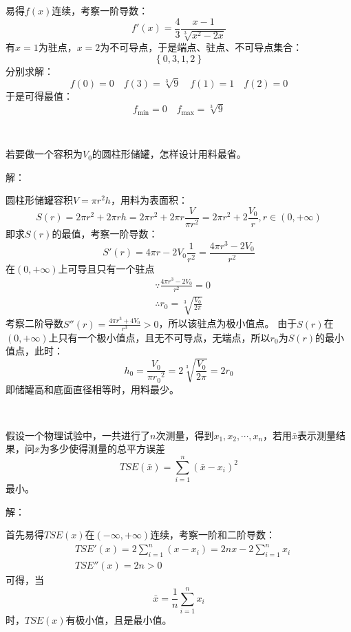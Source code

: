 易得$f\left( x \right) $连续，考察一阶导数：
\[
f'\left( x \right) =\frac{4}{3}\frac{x-1}{\sqrt[3]{x^2-2x}}
\]
有$x=1$为驻点，$x=2$为不可导点，于是端点、驻点、不可导点集合：
\[
\left\{ 0,3,1,2 \right\}
\]
分别求解：
\[
f\left( 0 \right) =0 \quad f\left( 3 \right) =\sqrt[3]{9} \quad f\left( 1 \right) =1 \quad f\left( 2 \right) =0
\]
于是可得最值：
\[
f_{\min}=0 \quad f_{\max}=\sqrt[3]{9}
\]

~

\begin{example}
若要做一个容积为$V_0$的圆柱形储罐，怎样设计用料最省。
\end{example}

解：

圆柱形储罐容积$V=\pi r^2h$，用料为表面积：
\[
S\left( r \right) =2\pi r^2+2\pi rh=2\pi r^2+2\pi r\frac{V}{\pi r^2}=2\pi r^2+2\frac{V_0}{r},    r\in \left( 0,+\infty \right)
\]
即求$S\left( r \right) $的最值，考察一阶导数：
\[
S'\left( r \right) =4\pi r-2V_0\frac{1}{r^2}=\frac{4\pi r^3-2V_0}{r^2}
\]
在$\left( 0,+\infty \right) $上可导且只有一个驻点
\begin{align*}
&\because \frac{4\pi r^3-2V_0}{r^2}=0 \\
&\therefore r_0=\sqrt[3]{\frac{V_0}{2\pi}}
\end{align*}
考察二阶导数$S''\left( r \right) =\frac{4\pi r^3+4V_0}{r^3}>0$，所以该驻点为极小值点。
由于$S\left( r \right) $在$\left( 0,+\infty \right) $上只有一个极小值点，且无不可导点，无端点，所以$r_0$为$S\left( r \right) $的最小值点，此时：
\[
h_0=\frac{V_0}{\pi {r_0}^2}=2\sqrt[3]{\frac{V_0}{2\pi}}=2r_0
\]
即储罐高和底面直径相等时，用料最少。

~

\begin{example}
假设一个物理试验中，一共进行了$n$次测量，得到$x_1,x_2,\cdots ,x_n$，若用$\bar{x}$表示测量结果，问$\bar{x}$为多少使得测量的总平方误差
\[
TSE\left( \bar{x} \right) =\sum_{i=1}^n{\left( \bar{x}-x_i \right) ^2}
\]
最小。
\end{example}

解：

首先易得$TSE\left( x \right) $在$\left( -\infty ,+\infty \right) $连续，考察一阶和二阶导数：
\begin{align*}
&TSE'\left( x \right) =2\sum_{i=1}^n{\left( x-x_i \right)}=2nx-2\sum_{i=1}^n{x_i} \\
&TSE''\left( x \right) =2n>0
\end{align*}
可得，当
\[
\bar{x}=\frac{1}{n}\sum_{i=1}^n{x_i}
\]
时，$TSE\left( x \right) $有极小值，且是最小值。

